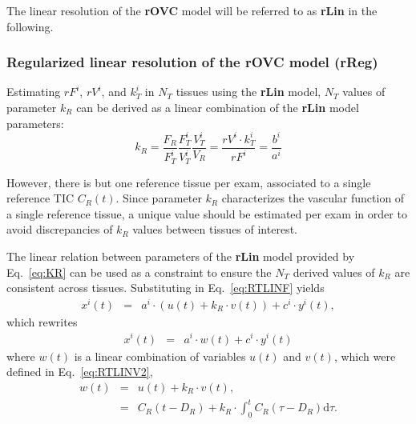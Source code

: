 The linear resolution of the \textbf{rOVC} model will be referred to as \textbf{rLin} in the following.

\subsubsection{Regularized linear resolution of the rOVC model (rReg)}
Estimating $rF^i$, $rV^i$, and $k_T^i$ in $N_T$ tissues using the \textbf{rLin} model, $N_T$ values of parameter $k_R$ can be derived as a linear combination of the \textbf{rLin} model parameters:
\begin{equation}
k_R = \frac{F_R}{F_T^i}\frac{F_T^i}{V_T^i}\frac{V_T^i}{V_R} = \frac{rV^i \cdot k_T^i}{rF^i} = \frac{b^i}{a^i}
\label{eq:KR}
\end{equation}

However, there is but one reference tissue per exam, associated to a single reference TIC $C_R\left(t\right)$. 
Since parameter $k_R$ characterizes the vascular function of a single reference tissue, a unique value should be estimated per exam in order to avoid discrepancies of $k_R$ values between tissues of interest. 

The linear relation between parameters of the \textbf{rLin} model provided by Eq.~\ref{eq:KR} can be used as a constraint to ensure the $N_T$ derived values of $k_R$ are consistent across tissues.
Substituting in Eq.~\ref{eq:RTLINF} yields 
\begin{equation}
\begin{array}{rcl}
x^i\left(t\right) &=& a^i\cdot\left( u\left(t\right) + k_R\cdot v\left(t\right)\right) + c^i\cdot y^i\left(t\right),
\end{array}
\label{eq:RTREG}
\end{equation}
which rewrites 
\begin{equation}
\begin{array}{rcl}
x^i\left(t\right) &=& a^i\cdot w\left(t\right) + c^i\cdot y^i\left(t\right)
\end{array}
\label{eq:RTREG2}
\end{equation}
where $w\left(t\right)$ is a linear combination of variables $u\left(t\right)$ and $v\left(t\right)$, which were defined in Eq.~\ref{eq:RTLINV2}, 
\begin{equation}
\begin{array}{rcl}
w\left(t\right) &=& u\left(t\right) + k_R \cdot v\left(t\right),\\
&=& C_{R}\left(t-D_R\right) + k_R \cdot \int_0^t C_{R} \left(\tau - D_{R}\right) \mathrm d\tau.
\end{array}
\label{eq:RTREG3}
\end{equation}

